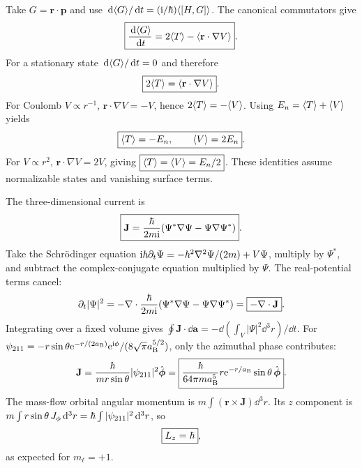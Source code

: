 Take $G=\mathbf r\cdot\mathbf p$ and use
$\,\mathrm d\langle G\rangle/\,\mathrm d t=(\mathrm i/\hbar)\langle [H,G]\rangle$.
The canonical commutators give
\begin{equation}
\boxed{\frac{\,\mathrm d\langle G\rangle}{\,\mathrm d t}
=2\langle T\rangle-\langle \mathbf r\cdot\nabla V\rangle}.
\end{equation}
For a stationary state $\,\mathrm d\langle G\rangle/\,\mathrm d t=0$
and therefore
\begin{equation}
\boxed{2\langle T\rangle=\langle \mathbf r\cdot\nabla V\rangle}.
\end{equation}
For Coulomb $V\propto r^{-1}$,
$\mathbf r\cdot\nabla V=-V$,
hence $2\langle T\rangle=-\langle V\rangle$.
Using $E_n=\langle T\rangle+\langle V\rangle$ yields
\begin{equation}
\boxed{\langle T\rangle=-E_n,\qquad\langle V\rangle=2E_n}.
\end{equation}
For $V\propto r^2$,
$\mathbf r\cdot\nabla V=2V$, giving
$\boxed{\langle T\rangle=\langle V\rangle=E_n/2}$.
These identities assume normalizable
states and vanishing surface terms.

The three-dimensional current is
\begin{equation}
\boxed{\mathbf J=\frac{\hbar}{2m\mathrm i}
(\Psi^*\nabla\Psi-\Psi\nabla\Psi^*)}.
\end{equation}
Take the Schrödinger equation
$\mathrm i\hbar\partial_t\Psi=
-\hbar^2\nabla^2\Psi/(2m)+V\Psi$,
multiply by $\Psi^*$, and subtract the
complex-conjugate equation multiplied by
$\Psi$. The real-potential terms cancel:
\begin{equation}
\partial_t|\Psi|^2=
-\nabla\cdot\frac{\hbar}{2m\mathrm i}
(\Psi^*\nabla\Psi-\Psi\nabla\Psi^*)
=\boxed{-\nabla\cdot\mathbf J}.
\end{equation}
Integrating over a fixed volume gives
$\oint\mathbf J\cdot\dd\mathbf a
=-\dd(\int_V|\Psi|^2\dd^3r)/\dd t$.
For $\psi_{211}=-r\sin\theta
\mathrm e^{-r/(2a_{\mathrm B})}\mathrm e^{\mathrm i\phi}/
(8\sqrt\pi a_{\mathrm B}^{5/2})$, only
the azimuthal phase contributes:
\begin{equation}
\mathbf J=\frac{\hbar}{mr\sin\theta}
|\psi_{211}|^2\hat{\boldsymbol\phi}
=\boxed{\frac{\hbar}{64\pi ma_{\mathrm B}^5}
r\mathrm e^{-r/a_{\mathrm B}}\sin\theta\,
\hat{\boldsymbol\phi}}.
\end{equation}
The mass-flow orbital angular momentum is
$m\int(\mathbf r\times\mathbf J)\dd^3r$.
Its $z$ component is
$m\int r\sin\theta\,J_\phi\,\mathrm d^3r=
\hbar\int|\psi_{211}|^2\,\mathrm d^3r$, so
\begin{equation}
\boxed{L_z=\hbar},
\end{equation}
as expected for $m_\ell=+1$.

